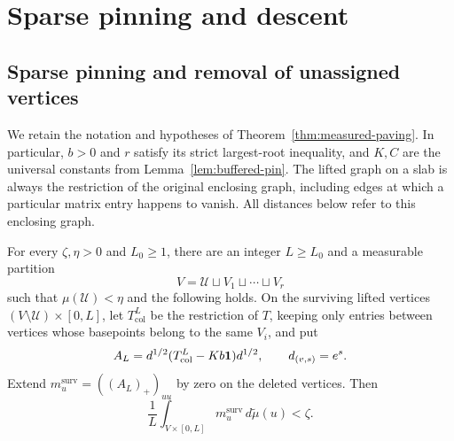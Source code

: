 \section{Sparse pinning and descent}
\label{sec:pinning}

\subsection{Sparse pinning and removal of unassigned vertices}

We retain the notation and hypotheses of Theorem~\ref{thm:measured-paving}.
In particular, $b>0$ and $r$ satisfy its strict largest-root inequality,
and $K,C$ are the universal constants from
Lemma~\ref{lem:buffered-pin}.  The lifted graph on a slab is always the
restriction of the original enclosing graph, including edges at which a
particular matrix entry happens to vanish.  All distances below refer to
this enclosing graph.

\begin{proposition}\label{prop:sparse-pinning}
For every $\zeta,\eta>0$ and $L_0\geq1$, there are an integer
$L\geq L_0$ and a measurable partition
\[
 V=\mathcal U\sqcup V_1\sqcup\cdots\sqcup V_r
\]
such that $\mu(\mathcal U)<\eta$ and the following holds.  On the
surviving lifted vertices $(V\setminus\mathcal U)\times[0,L]$, let
$T_{\mathrm{col}}^L$ be the restriction of $T$, keeping only entries
between vertices whose basepoints belong to the same $V_i$, and put
\begin{equation}\label{pin:surviving-operator}
 A_L=d^{1/2}(T_{\mathrm{col}}^L-Kb\mathbf 1)d^{1/2},
 \qquad d_{(v,s)}=e^s.
\end{equation}
Extend $m_u^{\mathrm{surv}}=((A_L)_+)_{uu}$ by zero on the deleted
vertices.  Then
\begin{equation}\label{pin:surviving-cost}
 \frac1L\int_{V\times[0,L]}m_u^{\mathrm{surv}}\,
 d\widetilde\mu(u)<\zeta.
\end{equation}
\end{proposition}

